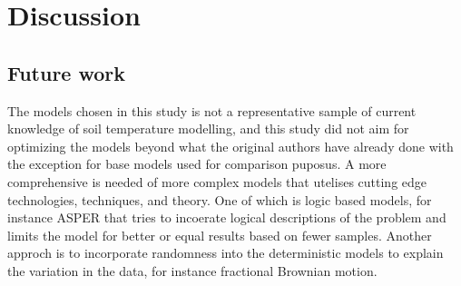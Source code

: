 \section{Discussion}

\subsection{Future work}

The models chosen in this study is not a representative sample of current knowledge of soil temperature modelling, and this study did not aim for optimizing the models beyond what the original authors have already done with the exception for base models used for comparison puposus. A more comprehensive is needed of more complex models that utelises cutting edge technologies, techniques, and theory. One of which is logic based models, for instance ASPER\cite{le_asper_2023} that tries to incoerate logical descriptions of the problem and limits the model for better or equal results based on fewer samples\cite{machot_bridging_2023}. Another approch is to incorporate randomness into the deterministic models to explain the variation in the data, for instance fractional Brownian motion\cite{di_crescenzo_model_2022}.